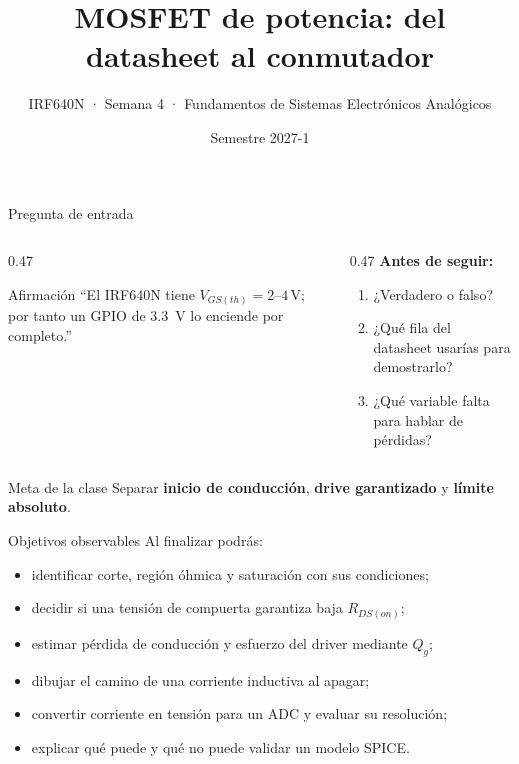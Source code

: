 \documentclass[aspectratio=169]{beamer}
\title[MOSFET]{MOSFET de potencia: del datasheet al conmutador}
\subtitle{IRF640N · Semana 4 · Fundamentos de Sistemas Electrónicos Analógicos}
\institute{Licenciatura en Ingeniería Aeroespacial · UNAM}
\date{Semestre 2027-1}
\begin{document}
\begin{frame}[plain]
  \titlepage
\end{frame}

\begin{frame}{Pregunta de entrada}
  \begin{columns}[T,onlytextwidth]
    \begin{column}{0.47\textwidth}
      \begin{block}{Afirmación}
        ``El IRF640N tiene $V_{GS(th)}=2$--$4\,\mathrm{V}$; por tanto un GPIO
        de \SI{3.3}{\volt} lo enciende por completo.''
      \end{block}
    \end{column}
    \begin{column}{0.47\textwidth}
      \textbf{Antes de seguir:}
      \begin{enumerate}
        \item ¿Verdadero o falso?
        \item ¿Qué fila del datasheet usarías para demostrarlo?
        \item ¿Qué variable falta para hablar de pérdidas?
      \end{enumerate}
    \end{column}
  \end{columns}
  \vfill
  \begin{alertblock}{Meta de la clase}
    Separar \textbf{inicio de conducción}, \textbf{drive garantizado} y
    \textbf{límite absoluto}.
  \end{alertblock}
\end{frame}

\begin{frame}{Objetivos observables}
  Al finalizar podrás:
  \begin{itemize}
    \item identificar corte, región óhmica y saturación con sus condiciones;
    \item decidir si una tensión de compuerta garantiza baja $R_{DS(on)}$;
    \item estimar pérdida de conducción y esfuerzo del driver mediante $Q_g$;
    \item dibujar el camino de una corriente inductiva al apagar;
    \item convertir corriente en tensión para un ADC y evaluar su resolución;
    \item explicar qué puede y qué no puede validar un modelo SPICE.
  \end{itemize}
\end{frame}
\end{document}
